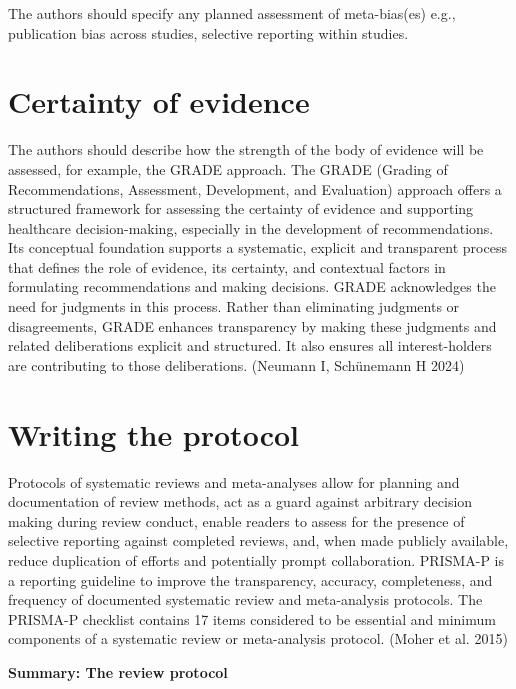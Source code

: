 \documentclass[
  10pt,
  a4paper,
  DIV=11,
  numbers=noendperiod]{scrreprt}
\begin{document}
The authors should specify any planned assessment of meta-bias(es) e.g.,
publication bias across studies, selective reporting within studies.

\section{Certainty of evidence}\label{certainty-of-evidence}

The authors should describe how the strength of the body of evidence
will be assessed, for example, the GRADE approach. The GRADE (Grading of
Recommendations, Assessment, Development, and Evaluation) approach
offers a structured framework for assessing the certainty of evidence
and supporting healthcare decision-making, especially in the development
of recommendations. Its conceptual foundation supports a systematic,
explicit and transparent process that defines the role of evidence, its
certainty, and contextual factors in formulating recommendations and
making decisions. GRADE acknowledges the need for judgments in this
process. Rather than eliminating judgments or disagreements, GRADE
enhances transparency by making these judgments and related
deliberations explicit and structured. It also ensures all
interest-holders are contributing to those deliberations. (Neumann I,
Schünemann H 2024)

\section{Writing the protocol}\label{writing-the-protocol}

Protocols of systematic reviews and meta-analyses allow for planning and
documentation of review methods, act as a guard against arbitrary
decision making during review conduct, enable readers to assess for the
presence of selective reporting against completed reviews, and, when
made publicly available, reduce duplication of efforts and potentially
prompt collaboration. PRISMA-P is a reporting guideline to improve the
transparency, accuracy, completeness, and frequency of documented
systematic review and meta-analysis protocols. The PRISMA-P checklist
contains 17 items considered to be essential and minimum components of a
systematic review or meta-analysis protocol. (Moher et al. 2015)

\textbf{Summary: The review protocol}
\end{document}
